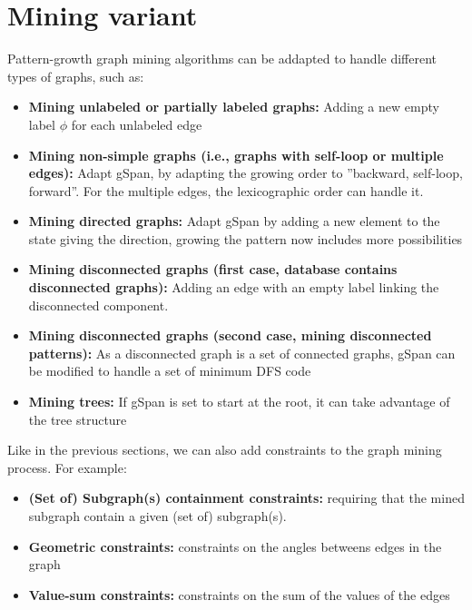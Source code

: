 \documentclass[12pt, openany]{report}
\theoremstyle{definition}
\begin{document}
\section{Mining variant}
Pattern-growth graph mining algorithms can be addapted to handle different
types of graphs, such as:
\begin{itemize}
    \item \textbf{Mining unlabeled or partially labeled graphs:} Adding a new empty label $\phi$ for each unlabeled edge
    \item \textbf{Mining non-simple graphs (i.e., graphs with self-loop or multiple edges):} Adapt gSpan, by adapting the growing order to ”backward, self-loop, forward”. For the multiple edges, the lexicographic order can handle it.
    \item \textbf{Mining directed graphs:} Adapt gSpan by adding a new element to the state giving the direction, growing the pattern now includes more possibilities
    \item \textbf{Mining disconnected graphs (first case, database contains disconnected graphs):} Adding an edge with an empty label linking the disconnected component.
    \item \textbf{Mining disconnected graphs (second case, mining disconnected patterns):} As a disconnected graph is a set of connected graphs, gSpan can be modified to handle a set of minimum DFS code
    \item \textbf{Mining trees:} If gSpan is set to start at the root, it can take advantage of the tree structure
\end{itemize}
Like in the previous sections, we can also add constraints to the graph mining process. For example:
\begin{itemize}
    \item \textbf{(Set of) Subgraph(s) containment constraints:} requiring that the mined subgraph contain a given (set of) subgraph(s).
    \item \textbf{Geometric constraints:} constraints on the angles betweens edges in the graph
    \item \textbf{Value-sum constraints:} constraints on the sum of the values of the edges
\end{itemize}
\end{document}

